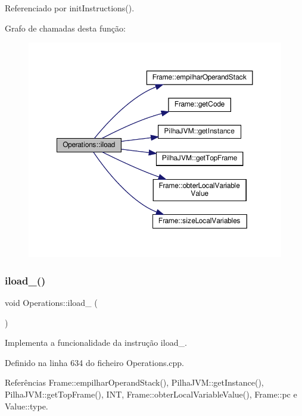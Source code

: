 Referenciado por init\+Instructions().

Grafo de chamadas desta função\+:\nopagebreak
\begin{figure}[H]
\begin{center}
\leavevmode
\includegraphics[width=350pt]{classOperations_a84e70afc25fa4e54a7e2bffae742222a_cgraph}
\end{center}
\end{figure}
\mbox{\label{classOperations_a3aba059cf78681767c141d27989fc2aa}} 
\subsubsection{\texorpdfstring{iload\+\_()}{iload\_0()}}
{\footnotesize\ttfamily void Operations\+::iload\+\_ (\begin{DoxyParamCaption}{ }\end{DoxyParamCaption})\hspace{0.3cm}{\ttfamily [private]}}



Implementa a funcionalidade da instrução iload\+\_. 



Definido na linha 634 do ficheiro Operations.\+cpp.



Referências Frame\+::empilhar\+Operand\+Stack(), Pilha\+J\+V\+M\+::get\+Instance(), Pilha\+J\+V\+M\+::get\+Top\+Frame(), I\+NT, Frame\+::obter\+Local\+Variable\+Value(), Frame\+::pc e Value\+::type.




